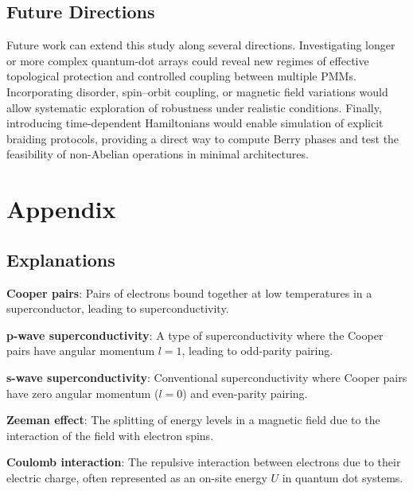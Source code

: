 \documentclass[11pt, letterpaper, titlepage]{article}
\begin{document}
\subsection{Future Directions}
Future work can extend this study along several directions. Investigating longer or more complex quantum-dot arrays could reveal new regimes of effective topological protection and controlled coupling between multiple PMMs. Incorporating disorder, spin–orbit coupling, or magnetic field variations would allow systematic exploration of robustness under realistic conditions. Finally, introducing time-dependent Hamiltonians would enable simulation of explicit braiding protocols, providing a direct way to compute Berry phases and test the feasibility of non-Abelian operations in minimal architectures.


\newpage
\section{Appendix}
\subsection{Explanations}

\textbf{Cooper pairs}: Pairs of electrons bound together at low temperatures in a superconductor, leading to superconductivity.

\textbf{p-wave superconductivity}: A type of superconductivity where the Cooper pairs have angular momentum \(l=1\), leading to odd-parity pairing.  

\textbf{s-wave superconductivity}: Conventional superconductivity where Cooper pairs have zero angular momentum (\(l=0\)) and even-parity pairing.  

\textbf{Zeeman effect}: The splitting of energy levels in a magnetic field due to the interaction of the field with electron spins.  

\textbf{Coulomb interaction}: The repulsive interaction between electrons due to their electric charge, often represented as an on-site energy \(U\) in quantum dot systems.

\printbibliography[heading=bibintoc,title={References}]
\end{document}
